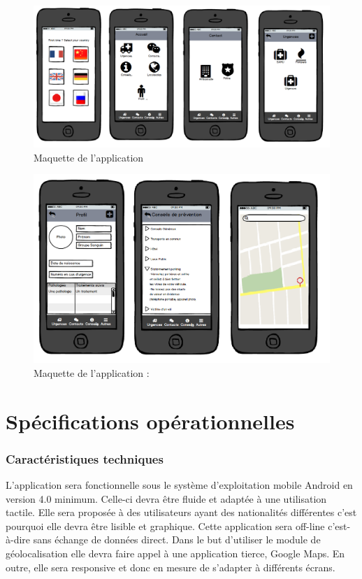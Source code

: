 \begin{figure}[H]
	\begin{center}
		\includegraphics[scale=0.5]{images/maquette1.png}
		\caption{Maquette de l'application}
		\label{maquette1} 
		
	\end{center}
\end{figure}

\begin{figure}[H]
	\begin{center}
		
		\includegraphics[scale=0.5]{images/maquette2.png}
		\caption{Maquette de l'application : }
		\label{maquette2} 
		
	\end{center}
\end{figure}

\section{Spécifications opérationnelles}

\subsubsection{Caractéristiques techniques}
	L'application sera fonctionnelle sous le système d'exploitation mobile Android en version 4.0 minimum. Celle-ci devra être fluide et adaptée à une utilisation tactile. Elle sera proposée à des  utilisateurs ayant des nationalités différentes c'est pourquoi elle devra être lisible et graphique.
	Cette application sera off-line c'est-à-dire sans échange de données direct. Dans le but d'utiliser le module de géolocalisation elle devra faire appel à une application tierce, Google Maps. En outre, elle sera responsive et donc en mesure de s'adapter à différents écrans.

